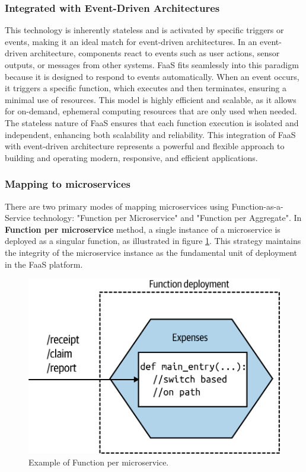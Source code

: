 \subsubsection{Integrated with Event-Driven Architectures}
This technology is inherently stateless and is activated by specific triggers or events, making it
an ideal match for event-driven architectures. In an event-driven architecture, components react to
events such as user actions, sensor outputs, or messages from other systems. FaaS fits seamlessly
into this paradigm because it is designed to respond to events automatically. When an event occurs,
it triggers a specific function, which executes and then terminates, ensuring a minimal use of
resources. This model is highly efficient and scalable, as it allows for on-demand, ephemeral
computing resources that are only used when needed. The stateless nature of FaaS ensures that each
function execution is isolated and independent, enhancing both scalability and reliability. This
integration of FaaS with event-driven architecture represents a powerful and flexible approach to
building and operating modern, responsive, and efficient applications.

\subsubsection{Mapping to microservices}
There are two primary modes of mapping microservices using Function-as-a-Service technology:
"Function per Microservice" and "Function per Aggregate".
\newline\newline
In \textbf{Function per microservice} method, a single instance of a microservice is deployed as a
singular function, as illustrated in figure \ref{fig:3_single_function}. This strategy maintains the
integrity of the microservice instance as the fundamental unit of deployment in the FaaS platform.

\begin{figure}
    \centering
    \includegraphics[scale=1]{Pictures/3_single_function.png}
    \caption{Example of Function per microservice.}
    \label{fig:3_single_function}
\end{figure}

